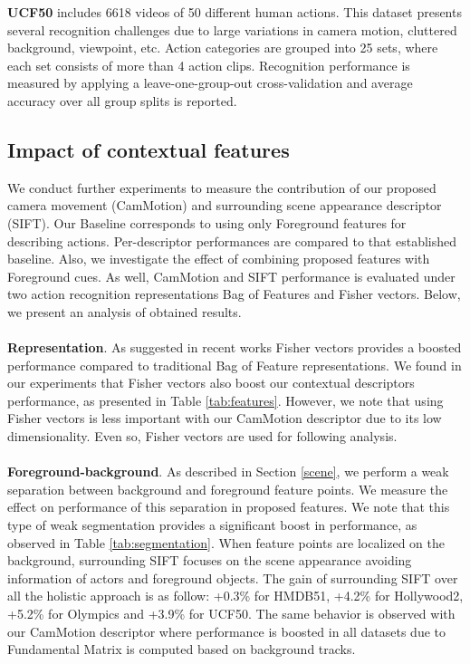 \textbf{UCF50} \cite{reddy2013} includes 6618 videos of 50 different human actions.  This dataset presents several recognition challenges due to large variations in camera motion, cluttered background, viewpoint, etc. Action categories are grouped into 25 sets, where each set consists of more than 4 action clips. Recognition performance is measured by applying a leave-one-group-out cross-validation and average accuracy over all group splits is reported. 


\subsection{Impact of contextual features}
We conduct further experiments to measure the  contribution of our proposed camera movement (CamMotion) and surrounding scene appearance descriptor (SIFT). Our Baseline corresponds to using only Foreground features for describing actions. Per-descriptor performances are compared to that established baseline. Also, we investigate the effect of combining proposed features with Foreground cues. As well, CamMotion and SIFT performance is evaluated under two action recognition representations \ie Bag of Features and Fisher vectors. Below, we present an analysis of obtained results.\\\\
\textbf{Representation}. As suggested in recent works \cite{perronnin2010, wang2013, xwang2013} Fisher vectors provides a boosted performance compared to traditional Bag of Feature representations. We found in our experiments that Fisher vectors also boost our contextual descriptors performance, as presented in Table \ref{tab:features}. However, we note that using Fisher vectors is less important with our CamMotion descriptor due to its low dimensionality. Even so, Fisher vectors are used for following analysis.\\\\
\textbf{Foreground-background}. As described in Section \ref{scene}, we perform a weak separation between background and foreground feature points. We measure the effect on performance of this separation in proposed features. We note that this type of weak segmentation provides a significant boost in performance, as observed in Table \ref{tab:segmentation}. When feature points are localized on the background, surrounding SIFT focuses on the scene appearance avoiding information of actors and foreground objects. The gain of surrounding SIFT over all the holistic approach is as follow: +0.3\% for HMDB51, +4.2\% for Hollywood2, +5.2\% for Olympics and +3.9\% for UCF50. The same behavior is observed with our CamMotion descriptor where performance is boosted in all datasets due to Fundamental Matrix is computed based on background tracks.\\\\
